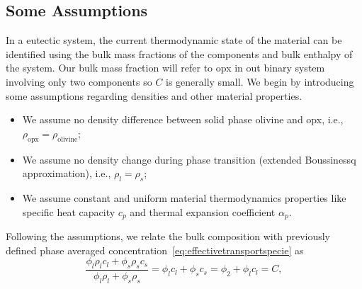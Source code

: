 \subsection{Some Assumptions}
In a eutectic system, the current thermodynamic state of the material can be identified using the bulk mass fractions of 
the components 
and bulk enthalpy of the system. Our bulk mass fraction will refer to opx in out
binary system involving only two components so $C$ is generally small.
We begin by introducing some assumptions regarding densities and other material 
properties.
\begin{itemize}
		  \item We assume no density difference between solid phase olivine and opx,
					 i.e., 
					 $\rho_{\text{opx}} = \rho_{\text{olivine}}$;
		  \item We assume no density change during phase transition 
					 (extended Boussinessq approximation), i.e., 
					 $\rho_l = \rho_s$;
		  \item We assume constant and uniform material thermodynamics properties 
					 like
					 specific heat capacity $c_p$ and thermal expansion coefficient $\alpha_p$.
\end{itemize}
Following the assumptions, we relate the bulk composition with previously defined
phase averaged concentration~\eqref{eq:effectivetransportspecie} as
\begin{equation}\label{eq:bulkmassfraction}
		  \frac{\phi_l \rho_l c_{l} + \phi_s \rho_s c_s}{\phi_l \rho_l + \phi_s \rho_s} 
		  = \phi_l c_{l} + \phi_s c_{s} = \phi_{2} + \phi_l c_l = C,
\end{equation}
